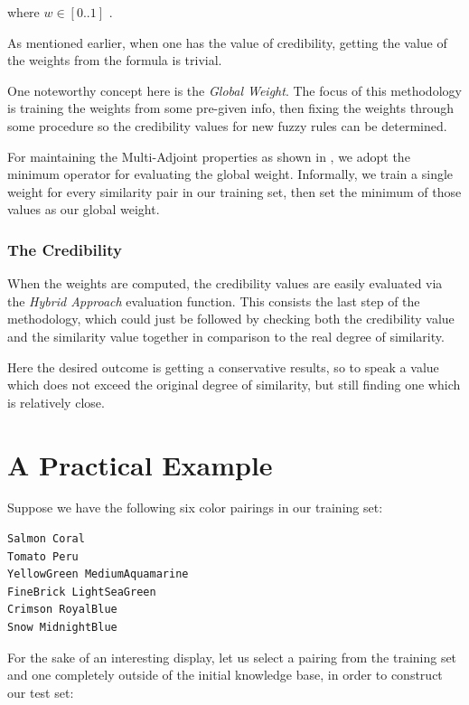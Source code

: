 \documentclass[egilmezThesis.tex]{subfiles}
\begin{document}
where $w \in [0..1]$ .

As mentioned earlier, when one has the value of credibility, getting the value of the weights from the formula is trivial. 

One noteworthy concept here is the \textit{Global Weight}. The focus of this methodology is training the weights from some pre-given info, then fixing the weights through some procedure so the credibility values for new fuzzy rules can be determined. 

For maintaining the Multi-Adjoint properties as shown in \cite{MPS10}, we adopt the minimum operator for evaluating the global weight. Informally, we train a single weight for every similarity pair in our training set, then set the minimum of those values as our global weight.


\subsubsection{The Credibility}
\label{credPE}

When the weights are computed, the credibility values are easily evaluated via the \textit{Hybrid Approach} evaluation function. This consists the last step of the methodology, which could just be followed by checking both the credibility value and the similarity value together in comparison to the real degree of similarity.

Here the desired outcome is getting a conservative results, so to speak a value which does not exceed the original degree of similarity, but still finding one which is relatively close.

\section{A Practical Example}
\label{ape}

Suppose we have the following six color pairings in our training set:
\newline

\lstset{language=C++,basicstyle=\footnotesize}
\begin{lstlisting}[caption=The training set, breaklines=true]
Salmon Coral
Tomato Peru
YellowGreen MediumAquamarine	
FineBrick LightSeaGreen
Crimson RoyalBlue
Snow MidnightBlue
\end{lstlisting}

For the sake of an interesting display, let us select a pairing from the training set and one completely outside of the initial knowledge base, in order to construct our test set:
\newline
\end{document}

